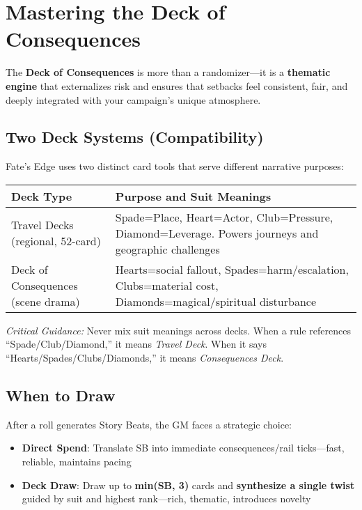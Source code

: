 \section*{Mastering the Deck of Consequences}

The \textbf{Deck of Consequences} is more than a randomizer---it is a \textbf{thematic engine} that externalizes risk and ensures that setbacks feel consistent, fair, and deeply integrated with your campaign's unique atmosphere.

\subsection*{Two Deck Systems (Compatibility)}

Fate's Edge uses two distinct card tools that serve different narrative purposes:

\begin{fatebox}
\begin{tabularx}{\textwidth}{lX}
\toprule
\textbf{Deck Type} & \textbf{Purpose and Suit Meanings} \\
\midrule
Travel Decks (regional, 52-card) & Spade=Place, Heart=Actor, Club=Pressure, Diamond=Leverage. Powers journeys and geographic challenges \\
Deck of Consequences (scene drama) & Hearts=social fallout, Spades=harm/escalation, Clubs=material cost, Diamonds=magical/spiritual disturbance \\
\bottomrule
\end{tabularx}
\end{fatebox}

\textit{Critical Guidance:} Never mix suit meanings across decks. When a rule references ``Spade/Club/Diamond,'' it means \emph{Travel Deck}. When it says ``Hearts/Spades/Clubs/Diamonds,'' it means \emph{Consequences Deck}.

\subsection*{When to Draw}

After a roll generates Story Beats, the GM faces a strategic choice:

\begin{itemize}
    \item \textbf{Direct Spend}: Translate SB into immediate consequences/rail ticks---fast, reliable, maintains pacing
    \item \textbf{Deck Draw}: Draw up to \textbf{min(SB, 3)} cards and \textbf{synthesize a single twist} guided by suit and highest rank---rich, thematic, introduces novelty
\end{itemize}

